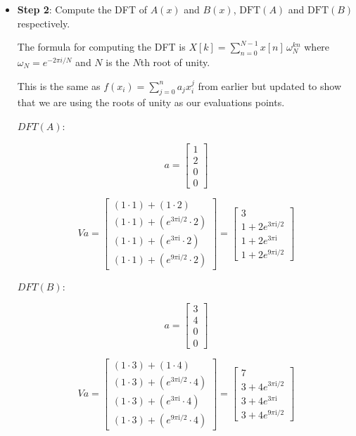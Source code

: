 \documentclass[11pt]{article}
\begin{document}
    \begin{itemize}
\item
  \textbf{Step 2}: Compute the DFT of \(A(x)\) and \(B(x)\),
  \(\mathrm{DFT}(A)\) and \(\mathrm{DFT}(B)\) respectively.

  The formula for computing the DFT is
  \(X[k] = \sum_{n=0}^{N-1} x[n]\, \omega_N^{kn}\) where
  \(\omega_N = e^{-2\pi i / N}\) and \(N\) is the \(N\)th root of unity.

  This is the same as \(f(x_i) = \sum^{n}_{j=0}a_jx^j_i\) from earlier
  but updated to show that we are using the roots of unity as our
  evaluations points.

  \(DFT(A)\):

  \[a = \begin{bmatrix}1 \\ 2 \\ 0 \\ 0 \end{bmatrix}\]

  \[Va = \begin{bmatrix}
     (1 \cdot 1) + (1 \cdot 2)
     \\ (1 \cdot 1) + (e^{{3\pi\mathrm{i}}/2} \cdot 2)
     \\ (1 \cdot 1) + (e^{3\pi\mathrm{i}} \cdot 2)  
     \\ (1 \cdot 1) + (e^{{9\pi\mathrm{i}}/2} \cdot 2) 
     \end{bmatrix} = 
     \begin{bmatrix} 3 
     \\ 1 + 2e^{{3\pi\mathrm{i}}/2} 
     \\ 1 + 2e^{3\pi\mathrm{i}} 
     \\ 1 + 2e^{{9\pi\mathrm{i}}/2}
     \end{bmatrix}\]

  \(DFT(B)\):

  \[a = \begin{bmatrix}3 \\ 4 \\ 0 \\ 0 \end{bmatrix}\]

  \[Va = \begin{bmatrix}
     (1 \cdot 3) + (1 \cdot 4)
     \\ (1 \cdot 3) + (e^{{3\pi\mathrm{i}}/2} \cdot 4) 
     \\ (1 \cdot 3) + (e^{3\pi\mathrm{i}} \cdot 4) 
     \\ (1 \cdot 3) + (e^{{9\pi\mathrm{i}}/2} \cdot 4) 
     \end{bmatrix} = 
     \begin{bmatrix} 7 
     \\ 3 + 4e^{{3\pi\mathrm{i}}/2}
     \\ 3 + 4e^{3\pi\mathrm{i}} 
     \\ 3 + 4e^{{9\pi\mathrm{i}}/2} 
     \end{bmatrix}\]
\end{itemize}
\end{document}
